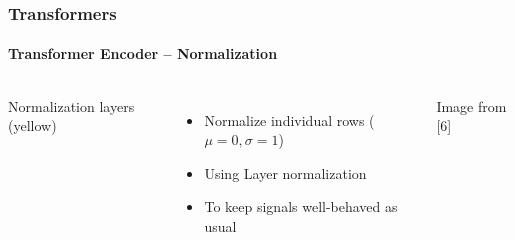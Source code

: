 \documentclass[xetex,professionalfont]{beamer}
\begin{document}
\begin{frame}
	\frametitle{Transformers}
	\framesubtitle{Transformer Encoder -- Normalization}

	\begin{columns}

		Normalization layers (yellow)
		\begin{itemize}
			\item Normalize individual rows ($\mu=0,\sigma=1$)
			\item Using Layer normalization
			\item To keep signals well-behaved as usual
		\end{itemize}


		\begin{center}
			{\centering Image from [6]}
		\end{center}

	\end{columns}

\end{frame}
\end{document}
